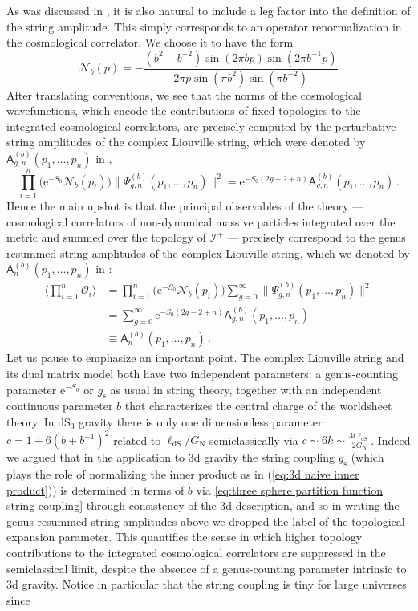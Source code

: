 \documentclass[12pt,a4paper]{article}
\newcommand{\be}{\begin{equation}}
\newcommand{\ee}{\end{equation}}
\begin{document}
As was discussed in \cite{paper1}, it is also natural to include a leg factor into the definition of the string amplitude. This simply corresponds to an operator renormalization in the cosmological correlator. We choose it to have the form
\be 
\mathcal{N}_b(p)=-\frac{(b^2-b^{-2})\sin(2\pi b p)\sin(2\pi b^{-1}p)}{2\pi p \sin(\pi b^2)\sin(\pi b^{-2})}
\ee
After translating conventions, we see that the norms of the cosmological wavefunctions, which encode the contributions of fixed topologies to the integrated cosmological correlators, are precisely computed by the perturbative string amplitudes of the complex Liouville string, which were denoted by $\mathsf{A}_{g,n}^{(b)}(p_1,\dots,p_n)$ in \cite{paper1}, 
\begin{equation}\label{eq:psign norm squared}
    \prod_{i=1}^n \big(\mathrm{e}^{-S_0}\mathcal{N}_b(p_i)\big)\lVert \Psi_{g,n}^{(b)}(p_1,\ldots,p_n)\rVert^2 = \mathrm{e}^{-S_0(2g-2+n)}\mathsf{A}_{g,n}^{(b)}(p_1,\ldots,p_n)\, .
\end{equation}
Hence the main upshot is that the principal observables of the theory --- cosmological correlators of non-dynamical massive particles integrated over the metric and summed over the topology of $\mathcal{I}^+$ --- precisely correspond to the genus resummed string amplitudes of the complex Liouville string, which we denoted by $\mathsf{A}_n^{(b)}(p_1,\dots,p_n)$ in \cite{paper1,paper2,paper3}:
\begin{align}
    \Big\langle\prod_{i=1}^n\mathcal{O}_i\Big\rangle &= \prod_{i=1}^n \big(\mathrm{e}^{-S_0}\mathcal{N}_b(p_i)\big)\sum_{g=0}^\infty \lVert\Psi^{(b)}_{g,n}(p_1,\ldots,p_n)\rVert^2\nonumber\\
    &= \sum_{g=0}^\infty \mathrm{e}^{-S_0(2g-2+n)}\mathsf{A}_{g,n}^{(b)}(p_1,\ldots,p_n)\nonumber\\
    &\equiv \mathsf{A}_n^{(b)}(p_1,\ldots,p_n)\,.
\end{align}
Let us pause to emphasize an important point. The complex Liouville string and its dual matrix model both have two independent parameters: a genus-counting parameter $\mathrm{e}^{-S_0}$ or $g_{\text{s}}$ as usual in string theory, together with an independent continuous parameter $b$ that characterizes the central charge of the worldsheet theory. In dS$_3$ gravity there is only one dimensionless parameter $c=1+6(b+b^{-1})^2$ related to $\ell_\text{dS}/G_\text{N}$ semiclassically via $c \sim 6k \sim \frac{3 i \ell_\text{dS}}{2 G_\text{N}}$. Indeed we argued that in the application to 3d gravity the string coupling $g_\text{s}$ (which plays the role of normalizing the inner product as in (\ref{eq:3d naive inner product})) is determined in terms of $b$ via \eqref{eq:three sphere partition function string coupling} through consistency of the 3d description, and so in writing the genus-resummed string amplitudes above we dropped the label of the topological expansion parameter. This quantifies the sense in which higher topology contributions to the integrated cosmological correlators are suppressed in the semiclassical limit, despite the absence of a genus-counting parameter intrinsic to 3d gravity. Notice in particular that the string coupling is tiny for large universes since 
\end{document}
